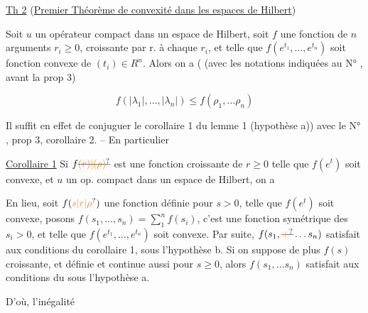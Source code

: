 
 \uline{Th 2} (\uline{Premier Théorème de convexité dans les espaces de Hilbert})

 Soit $u$ un opérateur compact dans un espace de Hilbert, soit  $f$ une fonction  de $n$ arguments $r_i\geq0$, croissante par r. à chaque $r_i$, et telle que $f(e^{t_1},\ldots,e^{t_n})$ soit fonction convexe de $(t_i)\in R^n$. Alors on a ( (avec les notations indiquées au N° , avant la prop 3)

\[
f(|\lambda_1|,\ldots,|\lambda_n|)\leq f(\rho_1,\ldots\rho_n)\tag*{(17)}
\]

Il suffit en effet de conjuguer le corollaire 1 du lemme 1  (hypothèse a)) avec le N° , prop 3, corollaire 2. -- En particulier

\uline{Corollaire 1} Si $f\deleted{\unsure{(r)|(\rho)}}$ est une fonction  croissante de $r\geq0$ telle que $f(e^t)$ soit convexe, et $u$ un op. compact dans un espace de Hilbert, on a


En  lieu, soit $f(\unsure{s|r|\rho})$ une fonction définie pour $s>0$, telle que $f(e^t)$ soit convexe, posons $f(s_1,\ldots,s_n)=\sum_1^n f(s_i)$, c'est une fonction symétrique des  $s_i>0$, et telle que $f(e^{t_1},\ldots,e^{t_n})$ soit convexe. Par suite,  $f(s_1,\deleted{\unsure{+}}\ldots s_n)$ satisfait aux conditions du corollaire 1, sous l'hypothèse b. Si on suppose de plus $f(s)$ croissante, et définie et continue aussi pour $s\geq0$, alors $f(s_1,\ldots s_n)$ satisfait  aux conditions du  sous l'hypothèse a.

D'où,    l'inégalité

